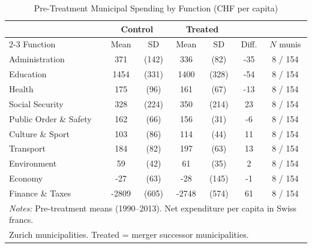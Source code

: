 \begin{table}[htbp]
\centering
\caption{Pre-Treatment Municipal Spending by Function (CHF per capita)}
\label{tab:sumstats}
\begin{tabular}{lcccccc}
\hline\hline
 & \multicolumn{2}{c}{Control} & \multicolumn{2}{c}{Treated} & & \\
\cline{2-3} \cline{4-5}
Function & Mean & SD & Mean & SD & Diff. & $N$ munis \\
\hline
Administration & 371 & (142) & 336 & (82) & -35 & 8 / 154 \\
Education & 1454 & (331) & 1400 & (328) & -54 & 8 / 154 \\
Health & 175 & (96) & 161 & (67) & -13 & 8 / 154 \\
Social Security & 328 & (224) & 350 & (214) & 23 & 8 / 154 \\
Public Order \& Safety & 162 & (66) & 156 & (31) & -6 & 8 / 154 \\
Culture \& Sport & 103 & (86) & 114 & (44) & 11 & 8 / 154 \\
Transport & 184 & (82) & 197 & (63) & 13 & 8 / 154 \\
Environment & 59 & (42) & 61 & (35) & 2 & 8 / 154 \\
Economy & -27 & (63) & -28 & (145) & -1 & 8 / 154 \\
Finance \& Taxes & -2809 & (605) & -2748 & (574) & 61 & 8 / 154 \\
\hline
\multicolumn{7}{l}{\footnotesize \textit{Notes:} Pre-treatment means (1990--2013). Net expenditure per capita in Swiss francs.} \\
\multicolumn{7}{l}{\footnotesize Zurich municipalities. Treated = merger successor municipalities.} \\
\end{tabular}
\end{table}
